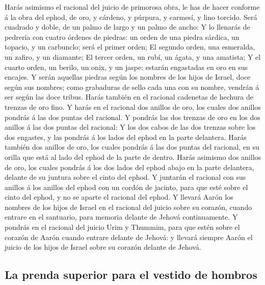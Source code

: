  Harás asimismo el racional del juicio de primorosa obra,
le has de hacer conforme á la obra del ephod, de oro, y cárdeno, y
púrpura, y carmesí, y lino torcido.  Será cuadrado y
doble, de un palmo de largo y un palmo de ancho:  Y lo
llenarás de pedrería con cuatro órdenes de piedras: un orden de una
piedra sárdica, un topacio, y un carbunclo; será el primer orden;
 El segundo orden, una esmeralda, un zafiro, y un
diamante;  El tercer orden, un rubí, un ágata, y una
amatista;  Y el cuarto orden, un berilo, un onix, y un
jaspe: estarán engastadas en oro en sus encajes.  Y serán
aquellas piedras según los nombres de los hijos de Israel, doce según
sus nombres; como grabaduras de sello cada una con su nombre, vendrán á
ser según las doce tribus.  Harás también en el racional
cadenetas de hechura de trenzas de oro fino.  Y harás en
el racional dos anillos de oro, los cuales dos anillos pondrás á las dos
puntas del racional.  Y pondrás las dos trenzas de oro en
los dos anillos á las dos puntas del racional:  Y los dos
cabos de las dos trenzas sobre los dos engastes, y las pondrás á los
lados del ephod en la parte delantera.  Harás también dos
anillos de oro, los cuales pondrás á las dos puntas del racional, en su
orilla que está al lado del ephod de la parte de dentro. 
Harás asimismo dos anillos de oro, los cuales pondrás á los dos lados
del ephod abajo en la parte delantera, delante de su juntura sobre el
cinto del ephod.  Y juntarán el racional con sus anillos
á los anillos del ephod con un cordón de jacinto, para que esté sobre el
cinto del ephod, y no se aparte el racional del ephod.  Y
llevará Aarón los nombres de los hijos de Israel en el racional del
juicio sobre su corazón, cuando entrare en el santuario, para memoria
delante de Jehová continuamente.  Y pondrás en el
racional del juicio Urim y Thummim, para que estén sobre el corazón de
Aarón cuando entrare delante de Jehová: y llevará siempre Aarón el
juicio de los hijos de Israel sobre su corazón delante de Jehová.

\hypertarget{la-prenda-superior-para-el-vestido-de-hombros}{%
\subsection{La prenda superior para el vestido de
hombros}\label{la-prenda-superior-para-el-vestido-de-hombros}}

